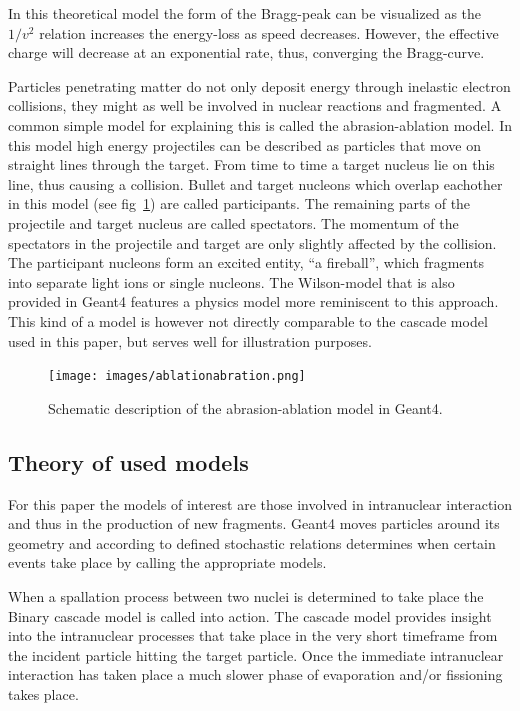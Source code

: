 In this theoretical model the form of the Bragg-peak can be visualized as the $1/v^2$ relation increases the energy-loss as speed decreases. However, the effective charge will decrease at an exponential rate, thus, converging the Bragg-curve.

Particles penetrating matter do not only deposit energy through inelastic electron collisions, they might as well be involved in nuclear reactions and fragmented. A common simple model for explaining this is called the abrasion-ablation model. In this model high energy projectiles can be described as particles that move on straight lines through the
target. From time to time a target nucleus lie on this line, thus causing a collision. Bullet
and target nucleons which overlap eachother in this model (see fig~\ref{fig:ablationabration}) are called participants. The remaining parts of the projectile and target nucleus are called spectators. The momentum of the spectators in the projectile and target are only slightly affected by the collision. The participant nucleons form an excited entity, ``a fireball'', which fragments into separate light ions or single nucleons.
The Wilson-model\cite[Chapter 27]{physicsManual} that is also provided in Geant4 features a physics model more reminiscent to this approach. This kind of a model is however not directly comparable to the cascade model used in this paper, but serves well for illustration purposes.
\begin{figure}[h]
\begin{center}
\texttt{[image: images/ablationabration.png]}  
\caption{Schematic description of the abrasion-ablation model in Geant4.~\cite[Chapter 27]{physicsManual}}
 \label{fig:ablationabration}
 \end{center}
 \end{figure}



\subsection{Theory of used models} %

For this paper the models of interest are those involved in intranuclear interaction and thus in the production of new fragments. Geant4 moves particles around its geometry and according to defined stochastic relations determines when certain events take place by calling the appropriate models.

When a spallation process between two nuclei is determined to take place the Binary cascade model is called into action. The cascade model provides insight into the intranuclear processes that take place in the very short timeframe from the incident particle hitting the target particle. Once the immediate intranuclear interaction has taken place a much slower phase of evaporation and/or fissioning takes place. 

